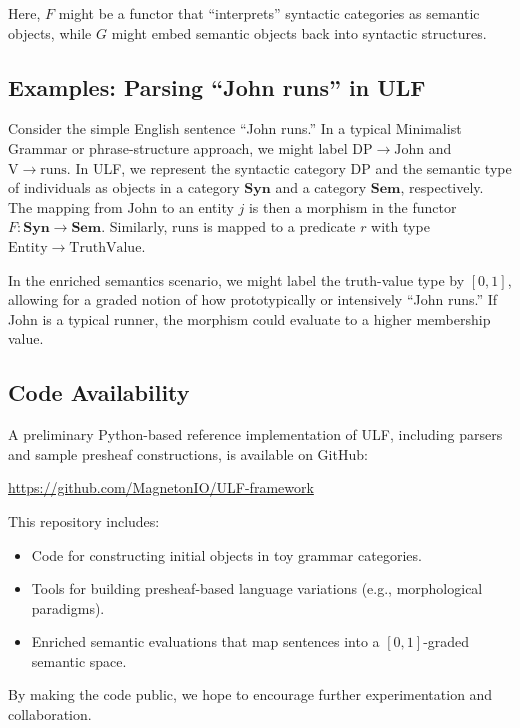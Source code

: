 \documentclass[12pt]{article}
\theoremstyle{plain}
\theoremstyle{definition}
\begin{document}
Here, \(F\) might be a functor that ``interprets'' syntactic categories as semantic objects, while \(G\) might embed semantic objects back into syntactic structures.

\subsection{Examples: Parsing ``John runs'' in ULF}
Consider the simple English sentence ``John runs.'' In a typical Minimalist Grammar or phrase-structure approach, we might label \(\mathrm{DP} \to \mathrm{John}\) and \(\mathrm{V} \to \mathrm{runs}\). In ULF, we represent the syntactic category \(\mathrm{DP}\) and the semantic type of individuals as objects in a category \(\mathbf{Syn}\) and a category \(\mathbf{Sem}\), respectively. The mapping from \(\mathrm{John}\) to an entity \(j\) is then a morphism in the functor \(F: \mathbf{Syn} \to \mathbf{Sem}\). Similarly, \(\mathrm{runs}\) is mapped to a predicate \(r\) with type \(\mathrm{Entity} \to \mathrm{TruthValue}\). 

In the enriched semantics scenario, we might label the truth-value type by \([0,1]\), allowing for a graded notion of how prototypically or intensively ``John runs.'' If John is a typical runner, the morphism could evaluate to a higher membership value.

\subsection{Code Availability}
A preliminary Python-based reference implementation of ULF, including parsers and sample presheaf constructions, is available on GitHub:

\begin{center}
\url{https://github.com/MagnetonIO/ULF-framework}
\end{center}

This repository includes:
\begin{itemize}
    \item Code for constructing initial objects in toy grammar categories.
    \item Tools for building presheaf-based language variations (e.g., morphological paradigms).
    \item Enriched semantic evaluations that map sentences into a \([0,1]\)-graded semantic space.
\end{itemize}

By making the code public, we hope to encourage further experimentation and collaboration.
\end{document}
